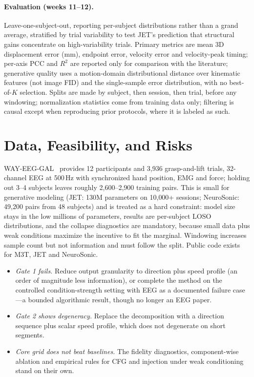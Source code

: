 \documentclass[11pt]{article}
\begin{document}
\paragraph{Evaluation (weeks 11--12).} Leave-one-subject-out, reporting per-subject distributions rather than a grand average, stratified by trial variability to test JET's prediction that structural gains concentrate on high-variability trials. Primary metrics are mean 3D displacement error (mm), endpoint error, velocity error and velocity-peak timing; per-axis PCC and $R^2$ are reported only for comparison with the literature; generative quality uses a motion-domain distributional distance over kinematic features (not image FID) and the single-sample error distribution, with no best-of-$K$ selection. Splits are made by subject, then session, then trial, before any windowing; normalization statistics come from training data only; filtering is causal except when reproducing prior protocols, where it is labeled as such.

\section{Data, Feasibility, and Risks}

WAY-EEG-GAL~\cite{wayeeggal} provides 12 participants and 3{,}936 grasp-and-lift trials, 32-channel EEG at 500\,Hz with synchronized hand position, EMG and force; holding out 3--4 subjects leaves roughly 2{,}600--2{,}900 training pairs. This is small for generative modeling (JET: 130M parameters on 10{,}000+ sessions; NeuroSonic: 49{,}200 pairs from 48 subjects) and is treated as a hard constraint: model size stays in the low millions of parameters, results are per-subject LOSO distributions, and the collapse diagnostics are mandatory, because small data plus weak conditions maximize the incentive to fit the marginal. Windowing increases sample count but not information and must follow the split. Public code exists for M3T, JET and NeuroSonic.

\begin{itemize}
\item \emph{Gate 1 fails.} Reduce output granularity to direction plus speed profile (an order of magnitude less information), or complete the method on the controlled condition-strength setting with EEG as a documented failure case---a bounded algorithmic result, though no longer an EEG paper.
\item \emph{Gate 2 shows degeneracy.} Replace the decomposition with a direction sequence plus scalar speed profile, which does not degenerate on short segments.
\item \emph{Core grid does not beat baselines.} The fidelity diagnostics, component-wise ablation and empirical rules for CFG and injection under weak conditioning stand on their own.
\end{itemize}
\end{document}
